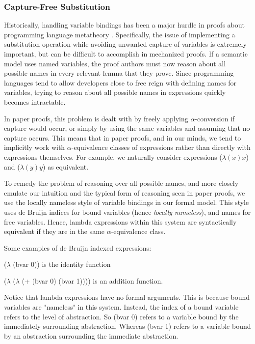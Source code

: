 \subsubsection{Capture-Free Substitution}
Historically, handling variable bindings has been a major hurdle in proofs about programming language metatheory \cite{}. Specifically, the issue of implementing a substitution operation while avoiding unwanted capture of variables is extremely important, but can be difficult to accomplish in mechanized proofs. If a semantic model uses named variables, the proof authors must now reason about all possible names in every relevant lemma that they prove. Since programming languages tend to allow developers close to free reign with defining names for variables, trying to reason about all possible names in expressions quickly becomes intractable. 

In paper proofs, this problem is dealt with by freely applying $\alpha$-conversion if capture would occur, or simply by using the same variables and assuming that no capture occurs. This means that in paper proofs, and in our minds, we tend to implicitly work with $\alpha$-equivalence classes of expressions rather than directly with expressions themselves. For example, we naturally consider expressions ($\lambda (x) x$) and ($\lambda (y) y$) as equivalent.

To remedy the problem of reasoning over all possible names, and more closely emulate our intuition and the typical form of reasoning seen in paper proofs, we use the locally nameless style of variable bindings in our formal model. This style uses de Bruijn indices for bound variables (hence \textit{locally nameless}), and names for free variables. Hence, lambda expressions within this system are syntactically equivalent if they are in the same $\alpha$-equivalence class.

Some examples of de Bruijn indexed expressions:

($\lambda$ (bvar 0)) is the identity function

($\lambda$ ($\lambda$ (+ (bvar 0) (bvar 1)))) is an addition function.

Notice that lambda expressions have no formal arguments. This is because bound variables are "nameless" in this system. Instead, the index of a bound variable refers to the level of abstraction. So (bvar 0) refers to a variable bound by the immediately surrounding abstraction. Whereas (bvar 1) refers to a variable bound by an abstraction surrounding the immediate abstraction.

